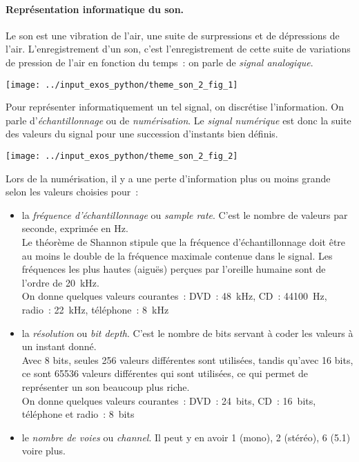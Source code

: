 % 

\paragraph{Représentation informatique du son.}

Le son est une vibration de l'air, une suite de surpressions et de
dépressions de l'air. L'enregistrement d'un son, c'est
l'enregistrement de cette suite de variations de pression de l'air en
fonction du temps~: on parle de \emph{signal analogique}.

\centerline{\texttt{[image: ../input\_exos\_python/theme\_son\_2\_fig\_1]}}

Pour représenter informatiquement un tel signal, on discrétise
l'information. On parle d'\emph{échantillonnage} ou de
\emph{numérisation}. Le \emph{signal numérique} est donc la suite des
valeurs du signal pour une succession d'instants bien définis. 

\centerline{\texttt{[image: ../input\_exos\_python/theme\_son\_2\_fig\_2]}}

Lors de la numérisation, il y a une perte d'information plus ou moins
grande selon les valeurs choisies pour~: 
\begin{itemize}
\item 
  la \emph{fréquence d'échantillonnage} ou \emph{sample rate}. C'est le
  nombre de valeurs par seconde, exprimée en Hz. \\
  Le théorème de Shannon stipule que la fréquence d'échantillonnage doit
  être au moins le double de la fréquence maximale contenue dans le
  signal. Les fréquences les plus hautes (aiguës) perçues par l'oreille
  humaine sont de l'ordre de 20~kHz. \\
  On donne quelques valeurs courantes~: DVD~: 48~kHz, CD~: 44100~Hz,
  radio~: 22~kHz, téléphone~: 8~kHz  
  
\item 
  la \emph{résolution} ou \emph{bit depth}. C'est le nombre de bits
  servant à coder les valeurs à un instant donné. \\
  Avec 8 bits, seules 256 valeurs différentes sont utilisées, tandis
  qu'avec 16 bits, ce sont 65536 valeurs différentes qui sont
  utilisées, ce qui permet de représenter un son beaucoup plus riche. 
  \\
  On donne quelques valeurs courantes~: DVD~: 24~bits, CD~: 16~bits,
  téléphone et radio~: 8~bits 
\item 
  le \emph{nombre de voies} ou \emph{channel}. Il peut y en avoir 1 (mono), 2
  (stéréo), 6 (5.1) voire plus. 
\end{itemize}

